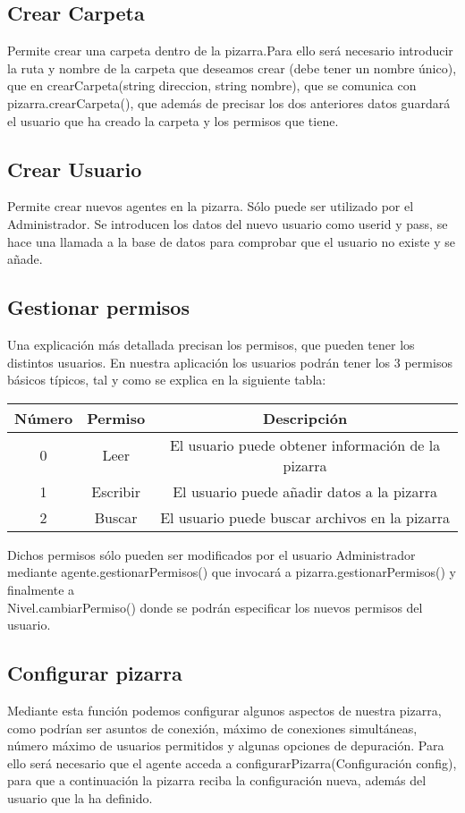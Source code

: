 \subsection{Crear Carpeta}
Permite crear una carpeta dentro de la pizarra.Para ello será necesario introducir la ruta y nombre de la carpeta que deseamos crear (debe tener un nombre único), que en crearCarpeta(string direccion, string nombre), que se comunica con pizarra.crearCarpeta(), que además de precisar los dos anteriores datos guardará el usuario que ha creado la carpeta y los permisos que tiene.

\subsection{Crear Usuario}
Permite crear nuevos agentes en la pizarra. Sólo puede ser utilizado por el Administrador. Se introducen los datos del nuevo usuario como userid y pass, se hace una llamada a la base de datos para comprobar que el usuario no existe y se añade.

\subsection{Gestionar permisos}
Una explicación más detallada precisan los permisos, que pueden tener los distintos usuarios. En nuestra aplicación los usuarios podrán tener los 3 permisos básicos típicos, tal y como se explica en la siguiente tabla: \\

\begin{center}
\begin{tabular}{|c|c|c|}
\hline
Número & Permiso  & Descripción \\
\hline
0& Leer & El usuario puede obtener información de la pizarra\\
1& Escribir & El usuario puede añadir datos a la pizarra\\
2& Buscar & El usuario puede buscar archivos en la pizarra\\
\hline
\end{tabular}
\end{center}

Dichos permisos sólo pueden ser modificados por el usuario Administrador mediante agente.gestionarPermisos() que invocará a pizarra.gestionarPermisos() y  finalmente a \\ Nivel.cambiarPermiso() donde se podrán especificar los nuevos permisos del usuario.

\subsection{Configurar pizarra}
Mediante esta función podemos configurar algunos aspectos de nuestra pizarra, como podrían ser asuntos de conexión, máximo de conexiones simultáneas, número máximo de usuarios permitidos y algunas opciones de depuración. Para ello será necesario que el agente acceda a configurarPizarra(Configuración config), para que a continuación la pizarra reciba la configuración nueva, además del usuario que la ha definido.

